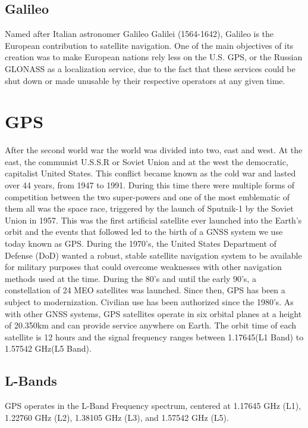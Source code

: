 \documentclass[conference]{IEEEtran}
\begin{document}
\subsection{Galileo}

Named after Italian astronomer Galileo Galilei (1564-1642), Galileo is the European contribution to satellite navigation. One of the main objectives of its creation was to make European nations rely less on the U.S. GPS, or the Russian GLONASS as a localization service, due to the fact that these services could be shut down or made unusable by their respective operators at any given time.

\section{GPS}

After the second world war the world was divided into two, east and west. At the east, the communist U.S.S.R or Soviet Union and at the west the democratic, capitalist United States. This conflict became known as the cold war and lasted over 44 years, from 1947 to 1991. During this time there were multiple forms of competition between the two super-powers and one of the most emblematic of them all was the space race, triggered by the launch of Sputnik-1 by the Soviet Union in 1957. This was the first artificial satellite ever launched into the Earth's orbit and the events that followed led to the birth of a GNSS system we use today known as GPS.
During the 1970's, the United States Department of Defense (DoD) wanted a robust, stable satellite navigation system to be available for military purposes that could overcome weaknesses with other navigation methods used at the time.
During the 80's and until the early 90's, a constellation of 24 MEO satellites was launched. Since then, GPS has been a subject to modernization. Civilian use has been authorized since the 1980's.
As with other GNSS systems, GPS satellites operate in six orbital planes at a height of 20.350km and can provide service anywhere on Earth. The orbit time of each satellite is 12 hours and the signal frequency ranges between 1.17645(L1 Band) to 1.57542 GHz(L5 Band).


\subsection{L-Bands}

GPS operates in the L-Band
Frequency spectrum, centered at 1.17645 GHz (L1), 1.22760 GHz (L2), 1.38105 GHz (L3), and 1.57542 GHz (L5).
\end{document}
